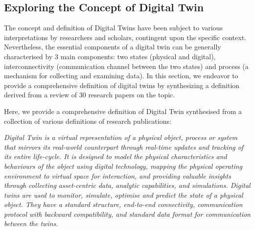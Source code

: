 %
\subsection{Exploring the Concept of Digital Twin}

The concept and definition of Digital Twins have been subject to various interpretations by researchers and scholars, contingent upon the specific context. Nevertheless, the essential components of a digital twin can be generally characterised by 3 main components: two states (physical and digital), interconnectivity (communication channel between the two states) and process (a mechanism for collecting and examining data). In this section, we endeavor to provide a comprehensive definition of digital twins by synthesizing a definition derived from a  review of 30 research papers on the topic.

Here, we provide a comprehensive definition of Digital Twin synthesised from a collection of various definitions of research publications:

\textit{ Digital Twin is a virtual representation of a physical object, process or system that mirrors its real-world counterpart through real-time updates and tracking of its entire life-cycle. It is designed to model the physical characteristics and behaviours of the object using digital technology, mapping the physical operating environment to virtual space for interaction, and providing valuable insights through collecting asset-centric data, analytic capabilities, and simulations. Digital twins are used to monitor, simulate, optimise and predict the state of a physical object. They have a standard structure, end-to-end connectivity, communication protocol with backward compatibility, and standard data format for communication between the twins.}

